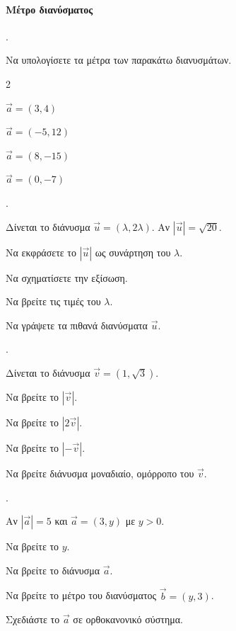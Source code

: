 \documentclass[11pt,a4paper,twocolumn]{article}
\newcounter{askhsh}
\newcommand{\askhsh}{\large\theaskhsh.\ \addtocounter{askhsh}{1}}
\begin{document}
\paragraph{Μέτρο διανύσματος}
\askhsh Να υπολογίσετε τα μέτρα των παρακάτω διανυσμάτων.
\begin{multicols}{2}
\begin{alist}
    \item $\vec{a}=(3,4)$
    \item $\vec{a}=(-5,12)$
    \item $\vec{a}=(8,-15)$
    \item $\vec{a}=(0,-7)$
\end{alist}
\end{multicols}

\askhsh Δίνεται το διάνυσμα $\vec{u}=(\lambda, 2\lambda)$. Αν $|\vec{u}|=\sqrt{20}$.

\begin{alist}
    \item Να εκφράσετε το $|\vec{u}|$ ως συνάρτηση του $\lambda$.
    \item Να σχηματίσετε την εξίσωση.
    \item Να βρείτε τις τιμές του $\lambda$.
    \item Να γράψετε τα πιθανά διανύσματα $\vec{u}$.
\end{alist}


\askhsh Δίνεται το διάνυσμα $\vec{v}=(1, \sqrt{3})$.

\begin{alist}
    \item Να βρείτε το $|\vec{v}|$.
    \item Να βρείτε το $|2\vec{v}|$.
    \item Να βρείτε το $|-\vec{v}|$.
    \item Να βρείτε διάνυσμα μοναδιαίο, ομόρροπο του $\vec{v}$.
\end{alist}


\askhsh Αν $|\vec{a}|=5$ και $\vec{a}=(3, y)$ με $y>0$.

\begin{alist}
    \item Να βρείτε το $y$.
    \item Να βρείτε το διάνυσμα $\vec{a}$.
    \item Να βρείτε το μέτρο του διανύσματος $\vec{b}=(y, 3)$.
    \item Σχεδιάστε το $\vec{a}$ σε ορθοκανονικό σύστημα.
\end{alist}
\end{document}
